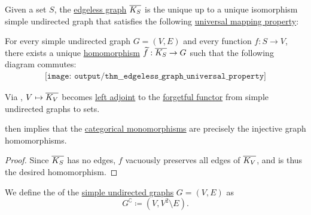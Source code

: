 \begin{theorem}\label{thm:edgeless_graph_universal_property}
  Given a set \( S \), the \hyperref[def:edgeless_graph]{edgeless graph} \( \oline{K_S} \) is the unique up to a unique isomorphism simple undirected graph that satisfies the following \hyperref[rem:universal_mapping_property]{universal mapping property}:
  \begin{displayquote}
    For every simple undirected graph \( G = (V, E) \) and every function \( f: S \to V \), there exists a unique \hyperref[def:undirected_graph/homomorphism]{homomorphism} \( \widetilde{f}: \oline{K_S} \to G \) such that the following diagram commutes:
    \begin{equation}\label{eq:thm:edgeless_graph_universal_property/diagram}
      \begin{aligned}
        \texttt{[image: output/thm\_\_edgeless\_graph\_universal\_property]}
      \end{aligned}
    \end{equation}
  \end{displayquote}
\end{theorem}
\begin{comments}
  \item Via , \( V \mapsto \oline{K_V} \) becomes \hyperref[def:category_adjunction]{left adjoint} to the \hyperref[def:concrete_category]{forgetful functor} from simple undirected graphs to sets.

   then implies that the \hyperref[def:morphism_invertibility/left_cancellative]{categorical monomorphisms} are precisely the injective graph homomorphisms.
\end{comments}
\begin{proof}
  Since \( \oline{K_S} \) has no edges, \( f \) vacuously preserves all edges of \( \oline{K_V} \), and is thus the desired homomorphism.
\end{proof}

\begin{definition}\label{def:graph_complement}
  We define the  of the \hyperref[def:undirected_graph]{simple undirected graphs} \( G = (V, E) \) as
  \begin{equation*}
     G^{\complement} \coloneqq (V, V^2 \setminus E).
  \end{equation*}
\end{definition}

